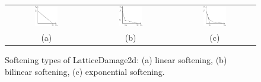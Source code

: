 \documentclass[a4paper]{article}
\begin{document}
\begin{figure}[!htb]
\begin{tabular}{ccc}
\begin{htmlonly}
\end{htmlonly}
\includegraphics[width=0.3\textwidth]{figSofteningLatticeDamage2da} & \includegraphics[width=0.3\textwidth]{figSofteningLatticeDamage2db} & \includegraphics[width=0.3\textwidth]{figSofteningLatticeDamage2dc}\\
(a) & (b) & (c)
\end{tabular}
  \caption{Softening types of LatticeDamage2d: (a) linear softening, (b) bilinear softening, (c) exponential softening.}
  \label{SofteningLatticeDamage2d}
\end{figure}
\end{document}
